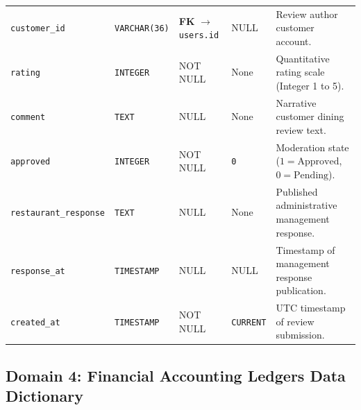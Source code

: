 \begin{table}[htbp]
\begin{tabularx}{\textwidth}{llp{3.2cm}lX}
\texttt{customer\_id}& \texttt{VARCHAR(36)}& \textbf{FK} $\to$ \texttt{users.id} & NULL & Review author customer account. \\
\texttt{rating} & \texttt{INTEGER} & NOT NULL & None & Quantitative rating scale (Integer 1 to 5). \\
\texttt{comment} & \texttt{TEXT} & NULL & None & Narrative customer dining review text. \\
\texttt{approved} & \texttt{INTEGER} & NOT NULL & \texttt{0} & Moderation state ($1 = \text{Approved}$, $0 = \text{Pending}$). \\
\texttt{restaurant\_response}& \texttt{TEXT} & NULL & None & Published administrative management response. \\
\texttt{response\_at}& \texttt{TIMESTAMP} & NULL & NULL & Timestamp of management response publication. \\
\texttt{created\_at} & \texttt{TIMESTAMP} & NOT NULL & \texttt{CURRENT} & UTC timestamp of review submission. \\
\bottomrule
\end{tabularx}
\end{table}

\subsection{Domain 4: Financial Accounting Ledgers Data Dictionary}

